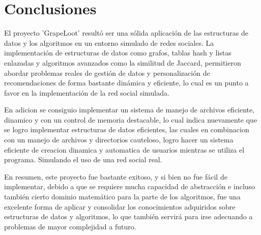 \section{Conclusiones}
El proyecto ’GrapeLoot' resultó ser una sólida aplicación de las estructuras de datos y los algoritmos en un entorno simulado de redes sociales.  La implementación de estructuras de datos como grafos, tablas hash y listas enlazadas y algoritmos avanzados como la similitud de Jaccard, permitieron abordar problemas reales de gestión de datos y personalización de recomendaciones de forma bastante dinámica y eficiente, lo cual es un punto a favor en la implementación de la red social simulada.

En adicion se consiguio implementar un sistema de manejo de archivos eficiente, dinamico y con un control de memoria destacable, lo cual indica nuevamente que se logro implementar estructuras de datos eficientes, las cuales en combinacion con un manejo de archivos y directorios cauteloso, logro hacer un sistema eficiente de creacion dinamica y automatica de usuarios mientras se utiliza el programa. Simulando el uso de una red social real.


En resumen, este proyecto fue bastante exitoso, y si bien no fue fácil de implementar, debido a que se requiere mucha capacidad de abstracción e incluso también cierto dominio matemático para la parte de los algoritmos, fue una excelente forma de aplicar y consolidar los conocimientos adquiridos sobre estructuras de datos y algoritmos, lo que también servirá para irse adecuando a problemas de mayor complejidad a futuro.

